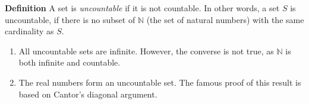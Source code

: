 \documentclass{article}
\newcommand{\N}[0]{\mathbb{N}}
\begin{document}

{\bf Definition} A set is \emph{uncountable} if it is not countable.
In other words, a set $S$ is uncountable, if
there is no subset of $\N$ (the set of natural numbers) with the same cardinality as $S$.

\begin{enumerate}
\item All uncountable sets are infinite. However, the converse is not
true, as $\N$ is both infinite and countable.
\item The real numbers form an uncountable set. The famous proof
of this result is based on Cantor's diagonal argument.
\end{enumerate}
\end{document}
